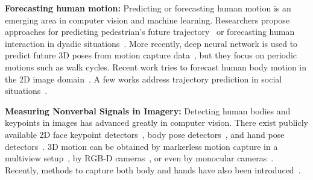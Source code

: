 \textbf{Forecasting human motion:}
Predicting or forecasting human motion is an emerging area in computer vision and machine learning. Researchers propose approaches for predicting pedestrian's future trajectory~\cite{kitani2012activity} or forecasting human interaction in dyadic situations~\cite{huang2014action}. More recently, deep neural network is used to predict future 3D poses from motion capture data~\cite{mnih2012conditional, Fragkiadaki_2015_ICCV, jain2016structural}, but they focus on periodic motions such as walk cycles. Recent work tries to forecast human body motion in the 2D image domain~\cite{walker2016uncertain, villegas2017learning}. A few works address trajectory prediction in social situations~\cite{helbing1995social, alahi2016social, gupta2018social}. 

%

\textbf{Measuring Nonverbal Signals in Imagery:} Detecting human bodies and keypoints in images has advanced greatly in computer vision. There exist publicly available 2D face keypoint detectors~\cite{baltruvsaitis2016openface}, body pose detectors~\cite{cao2017realtime, Wei2016, Newell-16}, and hand pose detectors~\cite{simon2017hand}. 3D motion can be obtained by markerless motion capture in a multiview setup~\cite{Gall-09,Liu-2013,Elhayek-15, joo2017panoptic, joo2018}, by RGB-D cameras~\cite{Shotton2011,Baak2011}, or even by monocular cameras~\cite{Ramakrishna2012,Bogo2016,martinez2017simple,zhou2017towards,Moreno-noguer2017,mehta2017monocular}. Recently, methods to capture both body and hands have also been introduced~\cite{MANO:SIGGRAPHASIA:2017,joo2018}. 


